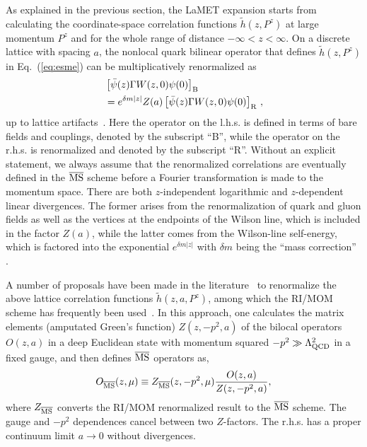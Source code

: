 \documentclass[preprint,12pt]{elsarticle}
\newcommand{\MS}{{\overline{\rm MS}}}
\newcommand{\nn}{\nonumber}
\DeclareRobustCommand{\eq}[1]{Eq.~(\ref{eq:#1})}
\begin{document}
As explained in the previous section,
the LaMET expansion starts from calculating the coordinate-space
correlation functions $\tilde h(z,P^z)$ at large momentum $P^z$ and for the whole range
of distance $-\infty<z<\infty$.
On a discrete
lattice with spacing $a$, the nonlocal quark bilinear operator that defines $\tilde h(z,P^z)$ in \eq{esme} can be multiplicatively renormalized as~\cite{Ji:2017oey,Ishikawa:2017faj,Green:2017xeu}
\begin{align}\label{eq:ren}
&\left[\bar{\psi}(z)\Gamma W(z,0)\psi(0)\right]_{\rm B} \nn\\
&= e^{\delta m|z|}Z(a) \left[\bar{\psi}(z)\Gamma W(z,0)\psi(0)\right]_{\rm R}\,,
\end{align}
up to lattice artifacts~\cite{Constantinou:2017sej,Chen:2017mie}. Here the operator on the l.h.s. is defined in terms of bare fields and couplings, denoted by the subscript ``B'', while the operator on the r.h.s. is renormalized and denoted by the subscript ``R''. Without an explicit
statement, we always assume that the renormalized correlations are eventually defined in the $\MS$ scheme before a Fourier transformation is made to the momentum space.
There are both $z$-independent
logarithmic and $z$-dependent linear divergences.
The former arises from the renormalization
of quark and gluon fields as well as the vertices at the endpoints of the Wilson line, which is included in the factor $Z(a)$, while
the latter comes from the Wilson-line self-energy, which is factored into the exponential $e^{\delta m|z|}$ with $\delta m$ being the ``mass correction'' .

A number of
proposals have been made in the literature~\cite{Ishikawa:2016znu,Chen:2016fxx,Monahan:2016bvm,Radyushkin:2017cyf,Constantinou:2017sej,Green:2017xeu,Stewart:2017tvs,Braun:2018brg,Li:2020xml} to renormalize the above lattice correlation functions $\tilde h(z, a, P^z)$, among which the RI/MOM scheme has frequently
been used~\cite{Constantinou:2017sej,Stewart:2017tvs}. In this approach,
one calculates the matrix elements (amputated Green's function) $Z(z,-p^2,a)$ of the bilocal operators $O(z,a)$ in a deep Euclidean state with momentum squared $-p^2\gg\Lambda_{\rm QCD}^2$ in a
fixed gauge, and then defines $\overline{\rm MS}$ operators
as,
\begin{align}
             O_{\overline{\rm MS}}(z,\mu) \equiv Z_{\overline{\rm MS}}(z,-p^2,\mu)\frac{O(z,a)}{Z(z,-p^2,a)},
\end{align}
where $Z_{\overline{\rm MS}}$ converts the RI/MOM renormalized result to the $\overline{\rm MS}$ scheme. The gauge and $-p^2$ dependences cancel between two $Z$-factors.
The r.h.s. has a proper continuum limit $a\to 0$ without divergences.
\end{document}
